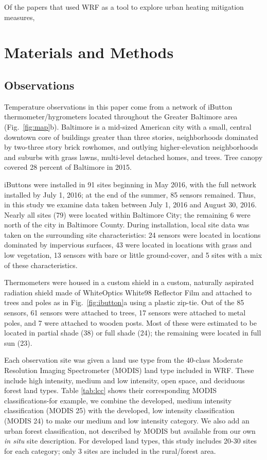 \documentclass[draft,linenumbers]{agujournal}
\begin{document}
Of the papers that used WRF as a tool to explore urban heating mitigation measures, 

\section{Materials and Methods}\label{sec:methods}

\subsection{Observations}
Temperature observations in this paper come from a network of iButton thermometer/hygrometers located throughout the Greater Baltimore area (Fig.~\ref{fig:map}b). Baltimore is a mid-sized American city with a small, central downtown core of buildings greater than three stories, neighborhoods dominated by two-three story brick rowhomes, and outlying higher-elevation neighborhoods and suburbs with grass lawns, multi-level detached homes, and trees. Tree canopy covered 28 percent of Baltimore in 2015. 

iButtons were installed in 91 sites beginning in May 2016, with the full network installed by July 1, 2016; at the end of the summer, 85 sensors remained. Thus, in this study we examine data taken between July 1, 2016 and August 30, 2016. Nearly all sites (79) were located within Baltimore City; the remaining 6 were north of the city in Baltimore County. During installation, local site data was taken on the surrounding site characteristics: 24 sensors were located in locations dominated by impervious surfaces, 43 were located in locations with grass and low vegetation, 13 sensors with bare or little ground-cover, and 5 sites with a mix of these characteristics. 

Thermometers were housed in a custom shield in a custom, naturally aspirated radiation shield made of WhiteOptics White98 Reflector Film and attached to trees and poles as in Fig.~\ref{fig:ibutton}a using a plastic zip-tie. Out of the 85 sensors, 61 sensors were attached to trees, 17 sensors were attached to metal poles, and 7 were attached to wooden posts. Most of these were estimated to be located in partial shade (38) or full shade (24); the remaining were located in full sun (23). 

Each observation site was given a land use type from the 40-class Moderate Resolution Imaging Spectrometer (MODIS) land type included in WRF. These include high intensity, medium and low intensity, open space, and deciduous forest land types. Table \ref{tab:lcc} shows their corresponding MODIS classifications-for example, we combine the developed, medium intensity classification (MODIS 25) with the developed, low intensity classification (MODIS 24) to make our medium and low intensity category. We also add an urban forest classification, not described by MODIS but available from our own \textit{in situ} site description. For developed land types, this study includes 20-30 sites for each category; only 3 sites are included in the rural/forest area. 
\end{document}
